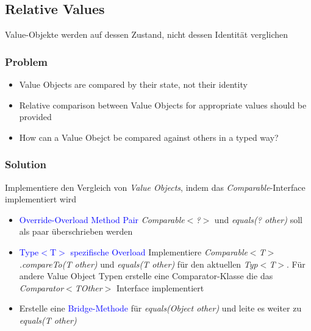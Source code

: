 \subsection{Relative Values}

Value-Objekte werden auf dessen Zustand, nicht dessen Identität verglichen

\subsubsection{Problem}
\begin{itemize}
    \item Value Objects are compared by their state, not their identity
    \item Relative comparison between Value Objects for appropriate values should be provided
    \item How can a Value Obejct be compared against others in a typed way?
\end{itemize}
\subsubsection{Solution}
Implementiere den Vergleich von \textit{Value Objects}, indem das \textit{Comparable}-Interface implementiert wird

\begin{itemize}
    \item \textcolor{blue}{Override-Overload Method Pair} \textit{Comparable$<$?$>$} und \textit{equals(? other)} soll als paar überschrieben werden
    \item \textcolor{blue}{Type$<$T$>$ spezifische Overload} Implementiere \textit{Comparable$<$T$>$.compareTo(T other)} und \textit{equals(T other)} für den aktuellen \textit{Typ$<$T$>$}. Für andere Value Object Typen erstelle eine Comparator-Klasse die das \textit{Comparator$<$TOther$>$} Interface implementiert
    \item Erstelle eine \textcolor{blue}{Bridge-Methode} für \textit{equals(Object other)} und leite es weiter zu \textit{equals(T other)}
\end{itemize}


